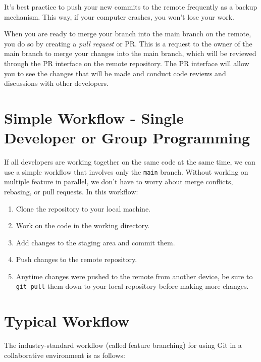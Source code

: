 \documentclass[fleqn]{article}
\begin{document}
It's best practice to push your new commits to the remote frequently as a 
backup mechanism. This way, if your computer crashes, you won't lose your work.

When you are ready to merge your branch into the main branch on the remote, you
do so by creating a \emph{pull request} or PR. This is a request to the owner
of the main branch to merge your changes into the main branch, which will be
reviewed through the PR interface on the remote repository. The PR interface
will allow you to see the changes that will be made and conduct code reviews and
discussions with other developers.

\pagebreak

\section*{Simple Workflow - Single Developer or Group Programming}

If all developers are working together on the same code at the same time, we can
use a simple workflow that involves only the \texttt{main} branch. Without
working on multiple feature in parallel, we don't have to worry about merge
conflicts, rebasing, or pull requests. In this workflow:

\begin{enumerate}
    \item Clone the repository to your local machine.
    \item Work on the code in the working directory.
    \item Add changes to the staging area and commit them.
    \item Push changes to the remote repository.
    \item Anytime changes were pushed to the remote from another device, be sure
          to \texttt{git pull} them down to your local repository before making
          more changes.
\end{enumerate}

\section*{Typical Workflow}

The industry-standard workflow (called feature branching) for using Git in a
collaborative environment is as follows:
\end{document}
